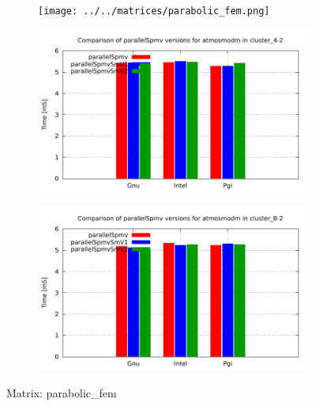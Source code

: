 \begin{figure} [ht!]
    \centering
    \captionsetup{justification=centering, singlelinecheck=false}
    \begin{subfigure}{.25\textwidth}
      \centering
      \hspace*{-1.5cm} 
      \texttt{[image: ../../matrices/parabolic\_fem.png]}
      \label{fig:parabolic_fem_matrix}
    \end{subfigure}%
    \begin{subfigure}{.37\textwidth}
      \centering
      \hspace*{-1.0cm} 
      \includegraphics[page=4, width=0.95\linewidth]{../plots/myCluster_4-2.pdf}
      \label{fig:parabolic_fem_performance}
    \end{subfigure}
    \begin{subfigure}{.37\textwidth}
      \centering
      \hspace*{-1.0cm} 
      \includegraphics[page=4, width=0.95\linewidth]{../plots/myCluster_8-2.pdf}
      \label{fig:parabolic_fem_performance}
    \end{subfigure}
\caption{Matrix: parabolic\_fem}
\label{fig:parabolic_fem}
\end{figure}

